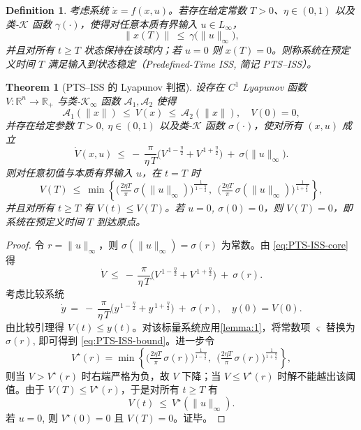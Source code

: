 \documentclass[pdflatex,sn-mathphys-num]{sn-jnl}%
\theoremstyle{thmstyleone}%
\newtheorem{theorem}{Theorem}%
\theoremstyle{thmstyletwo}%
\theoremstyle{thmstylethree}%
\newtheorem{definition}{Definition}%
\begin{document}
\begin{definition}\label{def:PTS-ISS}
	考虑系统 $\dot x = f(x,u)$。若存在给定常数 $T>0$、$\eta\in(0,1)$ 以及类-$\mathcal{K}$ 函数 $\gamma(\cdot)$，使得对任意本质有界输入 $u\in L_\infty$，
	\[
	\|x(T)\|\ \le\ \gamma\big(\|u\|_\infty\big),
	\]
	并且对所有 $t\ge T$ 状态保持在该球内；若 $u= 0$ 则 $x(T)=0$。则称系统在预定义时间 $T$ 满足输入到状态稳定（Predefined-Time ISS, 简记 PTS--ISS）。
	\end{definition}
	
	\begin{theorem}[PTS--ISS 的 Lyapunov 判据]\label{thm:PTS-ISS}
	设存在 $C^1$ Lyapunov 函数 $V:\mathbb{R}^n\to\mathbb{R}_+$ 与类-$\mathcal{K}_\infty$ 函数 $\mathcal{A}_1,\mathcal{A}_2$ 使得
	\[
	\mathcal{A}_1(\|x\|)\ \le\ V(x)\ \le\ \mathcal{A}_2(\|x\|),\quad V(0)=0,
	\]
	并存在给定参数 $T>0,\ \eta\in(0,1)$ 以及类-$\mathcal{K}$ 函数 $\sigma(\cdot)$，使对所有 $(x,u)$ 成立
	\begin{equation}\label{eq:PTS-ISS-core}
	\dot V(x,u)\ \le\ -\,\frac{\pi}{\eta\,T}\Big(V^{\,1-\frac{\eta}{2}}+V^{\,1+\frac{\eta}{2}}\Big)\ +\ \sigma\big(\|u\|_\infty\big).
	\end{equation}
	则对任意初值与本质有界输入 $u$，在 $t=T$ 时
	\begin{equation}\label{eq:PTS-ISS-bound}
	V(T)\ \le\ \min\!\left\{
	\Big(\tfrac{2\eta T}{\pi}\,\sigma(\|u\|_\infty)\Big)^{\!\frac{1}{\,1-\frac{\eta}{2}\,}},
	\ \ 
	\Big(\tfrac{2\eta T}{\pi}\,\sigma(\|u\|_\infty)\Big)^{\!\frac{1}{\,1+\frac{\eta}{2}\,}}
	\right\},
	\end{equation}
	并且对所有 $t\ge T$ 有 $V(t)\le V(T)$。若 $u= 0$, $\sigma(0)=0$，则 $V(T)=0$，即系统在预定义时间 $T$ 到达原点。
	\end{theorem}
	
	\begin{proof}
	令 $r=\|u\|_\infty$，则 $\sigma(\|u\|_\infty)=\sigma(r)$ 为常数。由 \cref{eq:PTS-ISS-core} 得
	\[
	\dot V\ \le\ -\,\frac{\pi}{\eta\,T}\Big(V^{\,1-\frac{\eta}{2}}+V^{\,1+\frac{\eta}{2}}\Big)\ +\ \sigma(r).
	\]
	考虑比较系统
	\[
	\dot y\ =\ -\,\frac{\pi}{\eta\,T}\Big(y^{\,1-\frac{\eta}{2}}+y^{\,1+\frac{\eta}{2}}\Big)\ +\ \sigma(r),\quad y(0)=V(0).
	\]
	由比较引理得 $V(t)\le y(t)$。对该标量系统应用\cref{lemma:1}，将常数项 $\varsigma$ 替换为 $\sigma(r)$, 即可得到 \cref{eq:PTS-ISS-bound}。进一步令
\[
V^\star(r)=\min\!\left\{
\Big(\tfrac{2\eta T}{\pi}\,\sigma(r)\Big)^{\!\frac{1}{1-\frac{\eta}{2}}},
\ \ 
\Big(\tfrac{2\eta T}{\pi}\,\sigma(r)\Big)^{\!\frac{1}{1+\frac{\eta}{2}}}
\right\},
\]
则当 $V>V^\star(r)$ 时右端严格为负，故 $V$ 下降；当 $V\le V^\star(r)$ 时解不能越出该阈值。由于 $V(T)\le V^\star(r)$，于是对所有 $t\ge T$ 有
\[
V(t)\ \le\ V^\star(\|u\|_\infty).
\]
若 $u=0$, 则 $V^\star(0)=0$ 且 $V(T)=0$。证毕。

	\end{proof}
	
\end{document}
